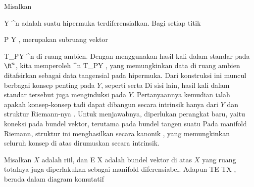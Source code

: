 \setcounter{section}{24}

Misalkan

\mavergleichskette
{\vergleichskette
{ Y
}
{ \subseteq }{ \R^n
}
{  }{
}
{    }{
}
{   }{
}
}
{}{}{ }
adalah suatu hipermuka terdiferensialkan. Bagi setiap titik

\mavergleichskette
{\vergleichskette
{ P
}
{ \in }{ Y
}
{  }{
}
{    }{
}
{   }{
}
}
{}{}{,}
merupakan subruang vektor

\mavergleichskette
{\vergleichskette
{ T_PY
}
{ \subseteq }{ \R^n
}
{  }{
}
{    }{
}
{   }{
}
}
{}{}{}
di ruang ambien. Dengan menggunakan hasil kali dalam standar pada $\R^n$, kita memperoleh
 {\R^n } { T_PY
} {,}
yang memungkinkan data di ruang ambien ditafsirkan sebagai data tangensial pada hipermuka. Dari konstruksi ini muncul berbagai konsep penting pada $Y$, seperti
serta
Di sisi lain, hasil kali dalam standar tersebut juga menginduksi
pada $Y$. Pertanyaannya kemudian ialah apakah konsep-konsep tadi dapat dibangun secara intrinsik hanya dari $Y$ dan struktur Riemann-nya
 {} {.}
Untuk menjawabnya, diperlukan perangkat baru, yaitu koneksi pada bundel vektor, terutama pada bundel tangen suatu
Pada manifold Riemann, struktur ini menghasilkan secara kanonik  {}
 {} {,}
yang memungkinkan seluruh konsep di atas dirumuskan secara intrinsik.


Misalkan $X$ adalah
riil, dan
 { E } { X
} {}
adalah bundel vektor di atas $X$ yang ruang totalnya juga diperlakukan sebagai manifold diferensiabel. Adapun
 {TE} {TX
} {,}
berada dalam diagram komutatif

 {  }

